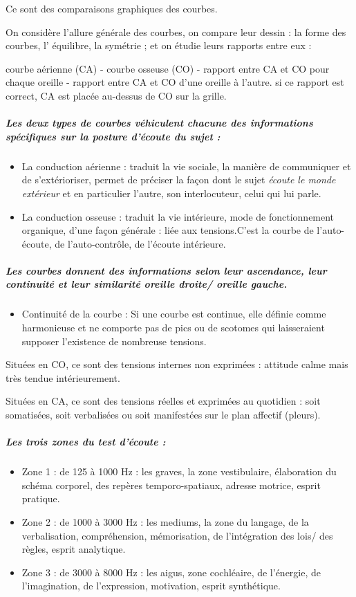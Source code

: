 \documentclass[12pt,french]{report}
\begin{document}
Ce sont des comparaisons graphiques des courbes. 

On considère l'allure générale des courbes, on compare leur dessin
: la forme des courbes, l' équilibre, la symétrie ; et on étudie leurs
rapports entre eux : 

courbe aérienne (CA) - courbe osseuse (CO) - rapport entre CA et CO
pour chaque oreille - rapport entre CA et CO d\textquoteright une
oreille à l'autre. si ce rapport est correct, CA est placée au-dessus
de CO sur la grille.

\subparagraph{Les deux types de courbes véhiculent chacune des informations spécifiques
sur la posture d'écoute du sujet : }
\begin{itemize}
\item La conduction aérienne : traduit la vie sociale, la manière de communiquer
et de s'extérioriser, permet de préciser la façon dont le sujet\emph{
écoute le monde extérieur} et en particulier l\textquoteright autre,
son interlocuteur, celui qui lui parle. 
\item La conduction osseuse : traduit la vie intérieure, mode de fonctionnement
organique, d'une façon générale : liée aux tensions.C'est la courbe
de l\textquoteright auto-écoute, de l\textquoteright auto-contrôle,
de l'écoute intérieure.
\end{itemize}

\subparagraph{Les courbes donnent des informations selon leur ascendance, leur
continuité et leur similarité oreille droite/ oreille gauche.}
\begin{itemize}
\item Continuité de la courbe : Si une courbe est continue, elle définie
comme harmonieuse et ne comporte pas de pics ou de scotomes qui laisseraient
supposer l'existence de nombreuse tensions.
\end{itemize}
Situées en CO, ce sont des tensions internes non exprimées : attitude
calme mais très tendue intérieurement.

Situées en CA, ce sont des tensions réelles et exprimées au quotidien
: soit somatisées, soit verbalisées ou soit manifestées sur le plan
affectif (pleurs).

\subparagraph{Les trois zones du test d'écoute : }
\begin{itemize}
\item Zone 1 : de 125 à 1000 Hz : les graves, la zone vestibulaire, élaboration
du schéma corporel, des repères temporo-spatiaux, adresse motrice,
esprit pratique.
\item Zone 2 : de 1000 à 3000 Hz : les mediums, la zone du langage, de la
verbalisation, compréhension, mémorisation, de l'intégration des lois/
des règles, esprit analytique.
\item Zone 3 : de 3000 à 8000 Hz : les aigus, zone cochléaire, de l'énergie,
de l'imagination, de l'expression, motivation, esprit synthétique.
\end{itemize}
\end{document}
